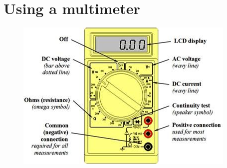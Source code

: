 \documentclass{article}
\theoremstyle{definition}
\theoremstyle{definition}
\theoremstyle{remark}
\begin{document}

\section{Using a multimeter} %
\label{sec:using_a_multimeter}

  \begin{figure}[!ht]
    \centering
    \includegraphics[width=0.65\paperwidth]{Images/image_a_1_(multimeter).png}
  \end{figure}

\end{document}
